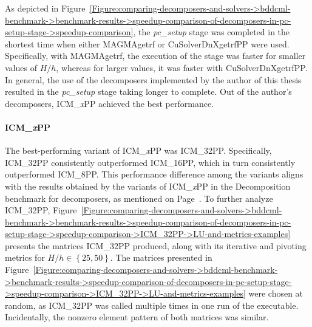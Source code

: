 As depicted in Figure~\ref{Figure:comparing-decomposers-and-solvers->bddcml-benchmark->benchmark-results->speedup-comparison-of-decomposers-in-pc-setup-stage->speedup-comparison}, the \textit{pc\_setup} stage was completed in the shortest time when either MAGMAgetrf or CuSolverDnXgetrfPP were used.
Specifically, with MAGMAgetrf, the execution of the stage was faster for smaller values of $H/h$, whereas for larger values, it was faster with CuSolverDnXgetrfPP.
In general, the use of the decomposers implemented by the author of this thesis resulted in the \textit{pc\_setup} stage taking longer to complete.
Out of the author's decomposers, ICM\_\textit{x}PP achieved the best performance.

\paragraph{ICM\_\textit{x}PP} The best-performing variant of ICM\_\textit{x}PP was ICM\_32PP.
Specifically, ICM\_32PP consistently outperformed ICM\_16PP, which in turn consistently outperformed ICM\_8PP.
This performance difference among the variants aligns with the results obtained by the variants of ICM\_\textit{x}PP in the Decomposition benchmark for decomposers, as mentioned on Page~\pageref{Text:comparing-decomposers-and-solvers->decomposition-project-benchmarks->decomposers-benchmark->comparison-of-execution-times-on-subset-of-matrices->ICMxPP->performance-of-variants}.
To further analyze ICM\_32PP, Figure~\ref{Figure:comparing-decomposers-and-solvers->bddcml-benchmark->benchmark-results->speedup-comparison-of-decomposers-in-pc-setup-stage->speedup-comparison->ICM_32PP->LU-and-metrics-examples} presents the  matrices ICM\_32PP produced, along with its iterative and pivoting metrics for $H/h \in \left\{25, 50\right\}$.
The matrices presented in Figure~\ref{Figure:comparing-decomposers-and-solvers->bddcml-benchmark->benchmark-results->speedup-comparison-of-decomposers-in-pc-setup-stage->speedup-comparison->ICM_32PP->LU-and-metrics-examples} were chosen at random, as ICM\_32PP was called multiple times in one run of the  executable.
Incidentally, the nonzero element pattern of both matrices was similar.

